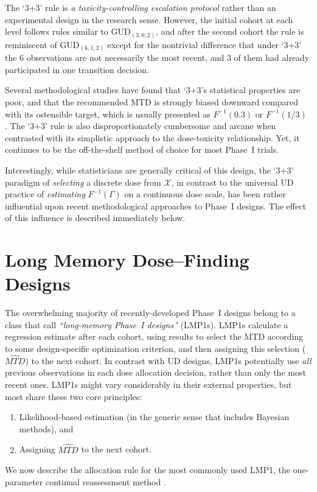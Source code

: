 The `3+3' rule is \emph{a toxicity-controlling escalation protocol} rather than an experimental design in the research sense. However, the initial cohort at each level follows rules similar to GUD$_{(3,0,2)}$, and after the second cohort the rule is reminiscent of GUD$_{(6,1,2)}$  except for the nontrivial difference that under `3+3' the 6 observations are not necessarily the most recent, and 3 of them had already participated in one transition decision.

Several methodological studies have found that `3+3's statistical properties are poor, and that the recommended MTD is strongly biased downward compared with its ostensible target, which is usually presented as $F^{-1}(0.3)$ or $F^{-1}(1/3)$ \citep{Rein:Paol:O'Qu:oper:1999,Lin:Shih:stat:2001}. The `3+3' rule is also disproportionately cumbersome and arcane when contrasted with its simplistic approach to the dose-toxicity relationship. Yet, it continues to be the off-the-shelf method of choice for most Phase~I trials.

Interestingly, while statisticians are generally critical of this design, the `3+3' paradigm of \emph{selecting} a discrete dose from $\mathcal{X}$, in contrast to the universal UD practice of \emph{estimating} $F^{-1}(\Gamma)$ on a continuous dose scale, has been rather influential upon recent methodological approaches to Phase~I designs. The effect of this influence is described immediately below.

\section{Long Memory Dose--Finding Designs}

The overwhelming majority of recently-developed Phase~I designs belong to a class that \cite{Oron:Hoff:smal:2013} call \emph{``long-memory Phase~I designs''} (LMP1s). LMP1s calculate a regression estimate after each cohort, using results to select the MTD according to some design-specific optimization criterion, and then assigning this selection ($\widehat{MTD}$) to the next cohort. In contrast with UD designs, LMP1s potentially use \emph{all} previous observations in each dose allocation decision, rather than only the most recent ones. LMP1s might vary considerably in their external properties, but most share these two core principles:
\begin{enumerate}
\item Likelihood-based estimation (in the generic sense that includes Bayesian methods), and
\item Assigning  $\widehat{MTD}$ to the next cohort.
\end{enumerate}
We now describe the allocation rule for the most commonly used LMP1, the one-parameter continual reassessment method  \citep{O'Qu:Pepe:Fish:cont:1990}.

